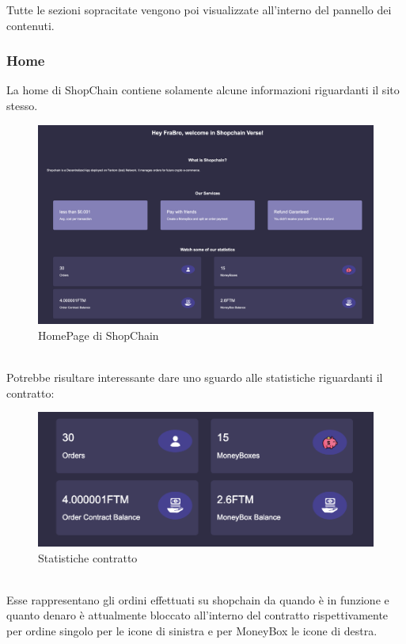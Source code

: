     Tutte le sezioni sopracitate vengono poi visualizzate all'interno del pannello dei contenuti.

    
        \subsubsection{Home}
        La home di ShopChain contiene solamente alcune informazioni riguardanti il sito stesso.
        \begin{figure}[H]
            \centering
            \includegraphics[scale=0.2]{immagini/Home.png}
            \caption{HomePage di ShopChain}
        \end{figure}
        \textbf{}\\
        Potrebbe risultare interessante dare uno sguardo alle statistiche riguardanti il contratto:
        \begin{figure}[H]
            \centering
            \includegraphics[scale=0.4]{immagini/ContractDetails.png}
            \caption{Statistiche contratto}
        \end{figure}
        \textbf{}\\
        Esse rappresentano gli ordini effettuati su shopchain da quando è in funzione e quanto denaro è attualmente bloccato all'interno del contratto rispettivamente per ordine singolo per le icone di sinistra e per MoneyBox le icone di destra.
